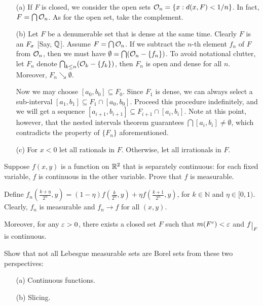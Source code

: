 \begin{Solution}
  \begin{itemize}
    \item [(a)] If $F$ is closed, we consider the open sets $\mathcal{O}_n=\{x:d(x,F)<1/n\}$. In fact, $F=\bigcap\mathcal{O}_n$. As for the open set, take the complement.
    \item [(b)] Let $F$ be a denumerable set that is dense at the same time. Clearly $F$ is an $F_\sigma$ [Say, $\mathbb{Q}$]. Assume $F=\bigcap\mathcal{O}_n$. If we subtract the $n$-th element $f_n$ of $F$ from $\mathcal{O}_n$, then we must have $\emptyset=\bigcap(\mathcal{O}_n-\{f_n\})$. To avoid notational clutter, let $F_n$ denote $\bigcap_{k\leq n}(\mathcal{O}_k-\{f_k\})$, then $F_n$ is open and dense for all $n$. Moreover, $F_n\searrow \emptyset$.
   
    Now we may choose $[a_0,b_0]\subseteq F_0$. Since $F_1$ is dense, we can always select a sub-interval $[a_1, b_1]\subseteq F_1\cap[a_0,b_0]$. Proceed this procedure indefinitely, and we will get a sequence $[a_{i+1}, b_{i+1}]\subseteq F_{i+1}\cap[a_i,b_i]$. Note at this point, however, that the nested intervals theorem guarantees $\bigcap[a_i,b_i]\neq\emptyset$, which contradicts the property of $\{F_n\}$ aforementioned.
    \item [(c)] For $x<0$ let all rationals in $F$. Otherwise, let all irrationals in $F$.
  \end{itemize}
\end{Solution}

\begin{Exercise}
  Suppose $f(x,y)$ is a function on $\mathbb{R}^2$ that is separately continuous: for each fixed variable, $f$ is continuous in the other variable. Prove that $f$ is measurable.
\end{Exercise}

\begin{Solution}
  Define $f_n(\frac{k+\eta}{2^n},y)=(1-\eta)f(\frac{k}{2^n},y)+\eta f(\frac{k+1}{2^n},y)$, for $k\in\mathbb{N}$ and $\eta\in[0,1)$. Clearly, $f_n$ is measurable and $f_n\to f$ for all $(x,y)$.
\end{Solution}

\begin{remark}
  Moreover, for any $\varepsilon>0$, there exists a closed set $F$ such that $m(F^c)<\varepsilon$ and $f\restrict{F}$ is continuous.
\end{remark}

\begin{Exercise}[35']
  Show that not all Lebesgue measurable sets are Borel sets from these two perspectives:
  \begin{itemize}
    \item [(a)] Continuous functions.
    \item [(b)] Slicing.
  \end{itemize}
\end{Exercise}

